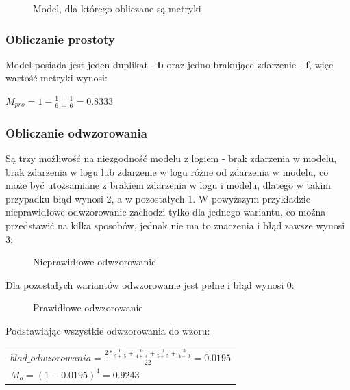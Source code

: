 \begin{figure}[h]
	\caption{\label{fig:metrics_business_process}Model, dla którego obliczane są metryki}
\end{figure}

\subsubsection{Obliczanie prostoty}
Model posiada jest jeden duplikat - \textbf{b} oraz jedno brakujące zdarzenie - \textbf{f}, więc wartość metryki wynosi:
\begin{center}
$M_{pro} = 1 - \frac{1\ +\ 1}{6\ +\ 6} = 0.8333$
\end{center}

\subsubsection{Obliczanie odwzorowania}
\label{sec:alignment-calculation}
Są trzy możliwość na niezgodność modelu z logiem -  brak zdarzenia w modelu, brak zdarzenia w logu lub zdarzenie w logu różne od zdarzenia w modelu, co może być utożsamiane z brakiem zdarzenia w logu i modelu, dlatego w takim przypadku błąd wynosi 2, a w pozostałych 1. W powyższym przykładzie nieprawidłowe odwzorowanie zachodzi tylko dla jednego wariantu, co można przedstawić na kilka sposobów, jednak nie ma to znaczenia i błąd zawsze wynosi 3:
\begin{figure}[H]
	\caption{\label{fig:bad-alignment}Nieprawidłowe odwzorowanie}
\end{figure}
Dla pozostałych wariantów odwzorowanie jest pełne i błąd wynosi 0:
\begin{figure}[h]
	\caption{\label{fig:good-alignment}Prawidłowe odwzorowanie}
\end{figure}
\newline Podstawiając wszystkie odwzorowania do wzoru:
\begin{center}
\begin{tabular}{l}
$blad\_odwzorowania = \frac{2 * \frac{0}{5 +\ 5} + \frac{0}{4 +\ 4} + \frac{0}{5 +\ 5} + \frac{3}{4 +\ 3}}{22} = 0.0195$ \\

$M_o = (1 - 0.0195)^4 = 0.9243$
\end{tabular}
\end{center}

